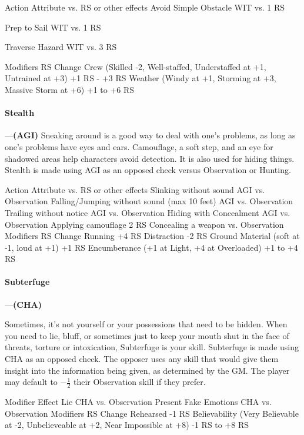 \documentclass[oneside,11pt,english]{book}
\begin{document}
Action Attribute vs. RS or other effects 
Avoid Simple Obstacle WIT vs. 1 RS 

Prep to Sail WIT vs. 1 RS 

Traverse Hazard WIT vs. 3 RS 

Modifiers RS Change 
Crew (Skilled -2, Well-staffed, Understaffed at +1, Untrained at +3) +1 RS - +3 RS 
Weather (Windy at +1, Storming at +3, Massive Storm at +6) +1 to +6 RS 

 

 

\paragraph{\label{skill:Stealth}Stealth}---\quad\textbf{(AGI)}
Sneaking around is a good way to deal with one’s problems, as long as one’s problems have eyes and ears. Camouflage, a soft step, and an eye for shadowed areas help characters avoid detection. It is also used for hiding things. Stealth is made using AGI as an opposed check versus Observation or Hunting.


Action Attribute vs. RS or other effects 
Slinking without sound AGI vs. Observation 
Falling/Jumping without sound (max 10 feet) AGI vs. Observation 
Trailing without notice AGI vs. Observation 
Hiding with Concealment AGI vs. Observation 
Applying camouflage 2 RS 
Concealing a weapon vs. Observation 
Modifiers RS Change 
Running +4 RS 
Distraction -2 RS 
Ground Material (soft at -1, loud at +1) +1 RS 
Encumberance (+1 at Light, +4 at Overloaded) +1 to +4 RS 

 


 

\paragraph{\label{skill:Subterfuge}Subterfuge}---\quad\textbf{(CHA)}\par
Sometimes, it’s not yourself or your possessions that need to be hidden. When you need to lie, bluff, or sometimes just to keep your mouth shut in the face of threats, torture or intoxication, Subterfuge is your skill. Subterfuge is made using CHA as an opposed check. The opposer uses any skill that would give them insight into the information being given, as determined by the GM. The player may default to $ -\frac{1}{2} $ their Observation skill if they prefer.


Modifier Effect 
Lie CHA vs. Observation 
Present Fake Emotions CHA vs. Observation 
Modifiers RS Change 
Rehearsed -1 RS 
Believability (Very Believable at -2, Unbelieveable at +2, Near Impossible at +8) -1 RS to +8 RS 
\end{document}
